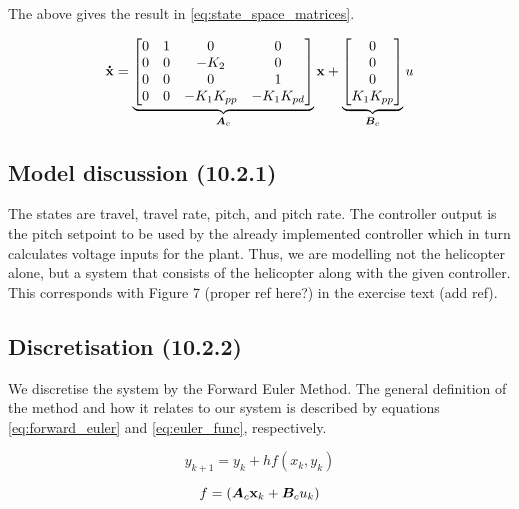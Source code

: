 The above gives the result in \eqref{eq:state_space_matrices}.

\begin{equation}\label{eq:state_space_matrices}
	\mathbf{\dot{x}} =
	\underbrace{
		\begin{bmatrix}
			0 & 1 & 0 				& 0 \\
			0 & 0 & -K_{2} 			& 0 \\
			0 & 0 & 0 				& 1 \\
			0 & 0 & -K_{1}K_{pp}	& -K_{1}K_{pd}
		\end{bmatrix}
	}_{\bm{A}_{c}}
	\mathbf{x} +
	\underbrace{
		\begin{bmatrix}
			0 \\ 0 \\ 0 \\ K_{1}K_{pp}
		\end{bmatrix}
	}_{\bm{B}_{c}}
	u
\end{equation}


\subsection{Model discussion (10.2.1)}
The states are travel, travel rate, pitch, and pitch rate. The controller output is the pitch setpoint to be used by the already implemented controller which in turn calculates voltage inputs for the plant. Thus, we are modelling not the helicopter alone, but a system that consists of the helicopter along with the given controller. This corresponds with Figure 7 (proper ref here?) in the exercise text (add ref).


\subsection{Discretisation (10.2.2)}
We discretise the system by the Forward Euler Method. The general definition of the method and how it relates to our system is described by equations \eqref{eq:forward_euler} and \eqref{eq:euler_func}, respectively.

\begin{equation}\label{eq:forward_euler}
	y_{k+1} = y_{k} + h f(x_{k}, y_{k})
\end{equation}

\begin{equation}\label{eq:euler_func}
	f = \left( \bm{A}_{c} \mathbf{x}_{k} + \bm{B}_c u_{k} \right)
\end{equation}


